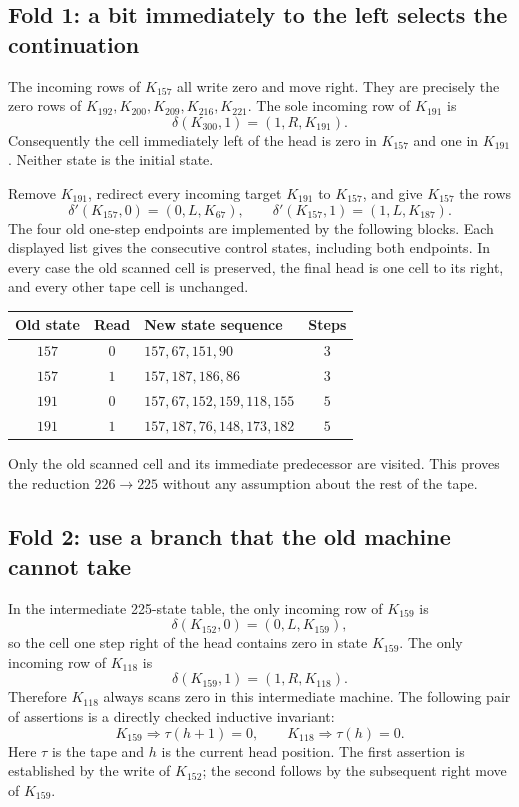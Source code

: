 \subsection{Fold 1: a bit immediately to the left selects the continuation}

The incoming rows of $K_{157}$ all write zero and move right.  They are
precisely the zero rows of $K_{192},K_{200},K_{209},K_{216},K_{221}$.
The sole incoming row of $K_{191}$ is
\[
 \delta(K_{300},1)=(1,R,K_{191}).
\]
Consequently the cell immediately left of the head is zero in $K_{157}$
and one in $K_{191}$.  Neither state is the initial state.

Remove $K_{191}$, redirect every incoming target $K_{191}$ to $K_{157}$,
and give $K_{157}$ the rows
\[
 \delta'(K_{157},0)=(0,L,K_{67}),\qquad
 \delta'(K_{157},1)=(1,L,K_{187}).
\]
The four old one-step endpoints are implemented by the following blocks.
Each displayed list gives the consecutive control states, including both
endpoints.  In every case the old scanned cell is preserved, the final head
is one cell to its right, and every other tape cell is unchanged.

\begin{center}
\begin{tabular}{cclc}
Old state & Read & New state sequence & Steps\\
\hline
$157$ & $0$ & $157,67,151,90$ & $3$\\
$157$ & $1$ & $157,187,186,86$ & $3$\\
$191$ & $0$ & $157,67,152,159,118,155$ & $5$\\
$191$ & $1$ & $157,187,76,148,173,182$ & $5$
\end{tabular}
\end{center}
Only the old scanned cell and its immediate predecessor are visited.  This
proves the reduction $226\longrightarrow225$ without any assumption about
the rest of the tape.

\subsection{Fold 2: use a branch that the old machine cannot take}

In the intermediate 225-state table, the only incoming row of $K_{159}$ is
\[
 \delta(K_{152},0)=(0,L,K_{159}),
\]
so the cell one step right of the head contains zero in state $K_{159}$.
The only incoming row of $K_{118}$ is
\[
 \delta(K_{159},1)=(1,R,K_{118}).
\]
Therefore $K_{118}$ always scans zero in this intermediate machine.  The
following pair of assertions is a directly checked inductive invariant:
\[
 K_{159}\Longrightarrow\tau(h+1)=0,\qquad
 K_{118}\Longrightarrow\tau(h)=0.
\]
Here $\tau$ is the tape and $h$ is the current head position.  The first
assertion is established by the write of $K_{152}$; the second follows by
the subsequent right move of $K_{159}$.

